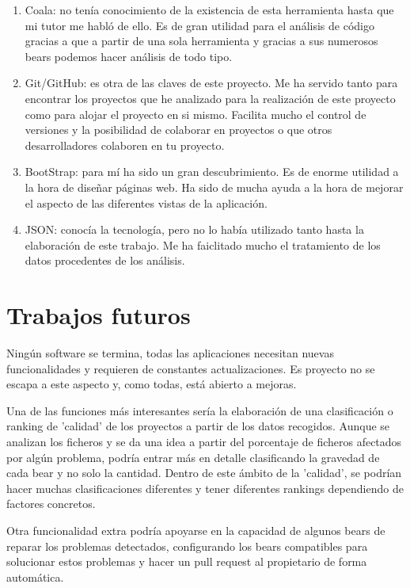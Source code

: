 \documentclass[a4paper, 12pt]{book}
\begin{document}
\begin{enumerate}
  \item Coala: no tenía conocimiento de la existencia de esta herramienta hasta que mi tutor me habló de ello. Es de gran utilidad para el análisis de código gracias a que a partir de una sola herramienta y gracias a sus numerosos bears podemos hacer análisis de todo tipo.
  \item Git/GitHub: es otra de las claves de este proyecto. Me ha servido tanto para encontrar los proyectos que he analizado para la realización de este proyecto como para alojar el proyecto en si mismo. Facilita mucho el control de versiones y la posibilidad de colaborar en proyectos o que otros desarrolladores colaboren en tu proyecto.
  \item BootStrap: para mí ha sido un gran descubrimiento. Es de enorme utilidad a la hora de diseñar páginas web. Ha sido de mucha ayuda a la hora de mejorar el aspecto de las diferentes vistas de la aplicación.
  \item JSON: conocía la tecnología, pero no lo había utilizado tanto hasta la elaboración de este trabajo. Me ha faiclitado mucho el tratamiento de los datos procedentes de los análisis.
\end{enumerate}


\section{Trabajos futuros}
\label{sec:trabajos_futuros}
Ningún software se termina, todas las aplicaciones necesitan nuevas funcionalidades y requieren de constantes actualizaciones. Es proyecto no se escapa a este aspecto y, como todas, está abierto a mejoras.

Una de las funciones más interesantes sería la elaboración de una clasificación o ranking de 'calidad' de los proyectos a partir de los datos recogidos. Aunque se analizan los ficheros y se da una idea a partir del porcentaje de ficheros afectados por algún problema, podría entrar más en detalle clasificando la gravedad de cada bear y no solo la cantidad. Dentro de este ámbito de la 'calidad', se podrían hacer muchas clasificaciones diferentes y tener diferentes rankings dependiendo de factores concretos.

Otra funcionalidad extra podría apoyarse en la capacidad de algunos bears de reparar los problemas detectados, configurando los bears compatibles para solucionar estos problemas y hacer un pull request al propietario de forma automática.
\end{document}
